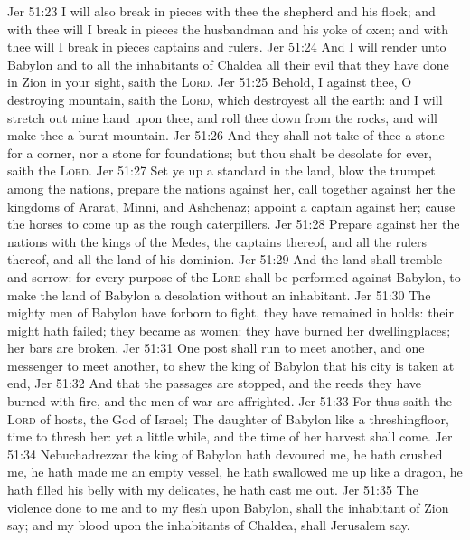 \vs Jer 51:23 I will also break in pieces with thee the shepherd and his flock; and with thee will I break in pieces the husbandman and his yoke of oxen; and with thee will I break in pieces captains and rulers.
\vs Jer 51:24 And I will render unto Babylon and to all the inhabitants of Chaldea all their evil that they have done in Zion in your sight, saith the \textsc{Lord}.
\vs Jer 51:25 Behold, I  against thee, O destroying mountain, saith the \textsc{Lord}, which destroyest all the earth: and I will stretch out mine hand upon thee, and roll thee down from the rocks, and will make thee a burnt mountain.
\vs Jer 51:26 And they shall not take of thee a stone for a corner, nor a stone for foundations; but thou shalt be desolate for ever, saith the \textsc{Lord}.
\vs Jer 51:27 Set ye up a standard in the land, blow the trumpet among the nations, prepare the nations against her, call together against her the kingdoms of Ararat, Minni, and Ashchenaz; appoint a captain against her; cause the horses to come up as the rough caterpillers.
\vs Jer 51:28 Prepare against her the nations with the kings of the Medes, the captains thereof, and all the rulers thereof, and all the land of his dominion.
\vs Jer 51:29 And the land shall tremble and sorrow: for every purpose of the \textsc{Lord} shall be performed against Babylon, to make the land of Babylon a desolation without an inhabitant.
\vs Jer 51:30 The mighty men of Babylon have forborn to fight, they have remained in  holds: their might hath failed; they became as women: they have burned her dwellingplaces; her bars are broken.
\vs Jer 51:31 One post shall run to meet another, and one messenger to meet another, to shew the king of Babylon that his city is taken at  end,
\vs Jer 51:32 And that the passages are stopped, and the reeds they have burned with fire, and the men of war are affrighted.
\vs Jer 51:33 For thus saith the \textsc{Lord} of hosts, the God of Israel; The daughter of Babylon  like a threshingfloor,  time to thresh her: yet a little while, and the time of her harvest shall come.
\vs Jer 51:34 Nebuchadrezzar the king of Babylon hath devoured me, he hath crushed me, he hath made me an empty vessel, he hath swallowed me up like a dragon, he hath filled his belly with my delicates, he hath cast me out.
\vs Jer 51:35 The violence done to me and to my flesh  upon Babylon, shall the inhabitant of Zion say; and my blood upon the inhabitants of Chaldea, shall Jerusalem say.
